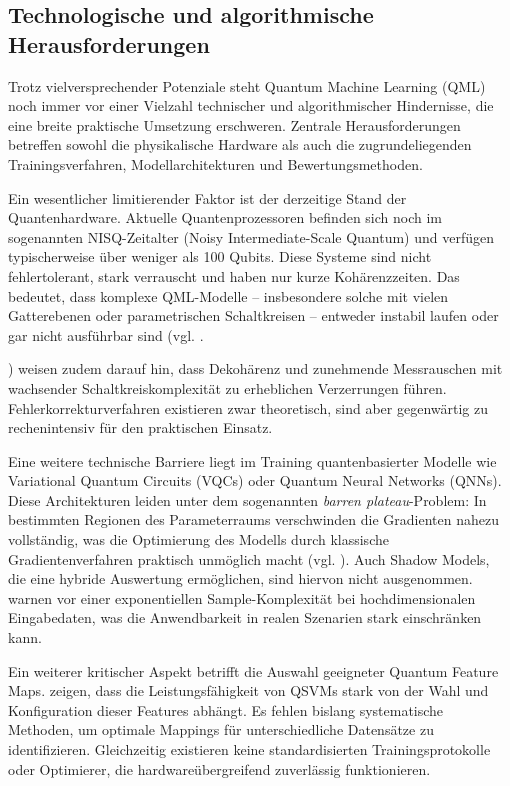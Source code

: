 \subsection{Technologische und algorithmische Herausforderungen}
Trotz vielversprechender Potenziale steht Quantum Machine Learning (QML) noch immer vor einer Vielzahl technischer und algorithmischer Hindernisse, die eine breite praktische Umsetzung erschweren. Zentrale Herausforderungen betreffen sowohl die physikalische Hardware als auch die zugrundeliegenden Trainingsverfahren, Modellarchitekturen und Bewertungsmethoden.

Ein wesentlicher limitierender Faktor ist der derzeitige Stand der Quantenhardware. Aktuelle Quantenprozessoren befinden sich noch im sogenannten NISQ-Zeitalter (Noisy Intermediate-Scale Quantum) und verfügen typischerweise über weniger als 100 Qubits. Diese Systeme sind nicht fehlertolerant, stark verrauscht und haben nur kurze Kohärenzzeiten. Das bedeutet, dass komplexe QML-Modelle – insbesondere solche mit vielen Gatterebenen oder parametrischen Schaltkreisen – entweder instabil laufen oder gar nicht ausführbar sind (vgl. \cite{peral-garciaSystematicLiteratureReview2024}.

\cite{gujjuQuantumMachineLearning2024}) \cite{tychola_quantum_2023} weisen zudem darauf hin, dass Dekohärenz und zunehmende Messrauschen mit wachsender Schaltkreiskomplexität zu erheblichen Verzerrungen führen. Fehlerkorrekturverfahren existieren zwar theoretisch, sind aber gegenwärtig zu rechenintensiv für den praktischen Einsatz.

Eine weitere technische Barriere liegt im Training quantenbasierter Modelle wie Variational Quantum Circuits (VQCs) oder Quantum Neural Networks (QNNs). Diese Architekturen leiden unter dem sogenannten \textit{barren plateau}-Problem: In bestimmten Regionen des Parameterraums verschwinden die Gradienten nahezu vollständig, was die Optimierung des Modells durch klassische Gradientenverfahren praktisch unmöglich macht (vgl. \cite{liuQuantumTrainRethinkingHybrid2024} \cite{tychola_quantum_2023}).
Auch Shadow Models, die eine hybride Auswertung ermöglichen, sind hiervon nicht ausgenommen. \cite{jerbiShadowsQuantumMachine2024} warnen vor einer exponentiellen Sample-Komplexität bei hochdimensionalen Eingabedaten, was die Anwendbarkeit in realen Szenarien stark einschränken kann.

Ein weiterer kritischer Aspekt betrifft die Auswahl geeigneter Quantum Feature Maps. \cite{kavithaQuantumMachineLearning2024} zeigen, dass die Leistungsfähigkeit von QSVMs stark von der Wahl und Konfiguration dieser Features abhängt. Es fehlen bislang systematische Methoden, um optimale Mappings für unterschiedliche Datensätze zu identifizieren. Gleichzeitig existieren keine standardisierten Trainingsprotokolle oder Optimierer, die hardwareübergreifend zuverlässig funktionieren.

